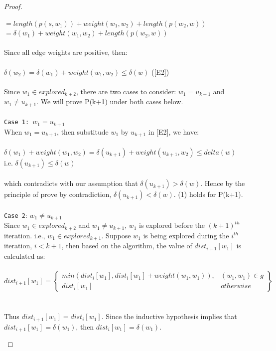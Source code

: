 \begin{proof}
\begin{itemize}
    \tab\tab $= length(p(s, w_1)) + weight(w_1, w_2) + length(p(w_2, w))$ \\
    \tab\tab $= \delta(w_1) + weight(w_1, w_2) + length(p(w_2, w))$
  \\\\
  Since all edge weights are positive, then: 
  \\\\
    \tab $\delta(w_2) = \delta(w_1) + weight(w_1, w_2) \leq \delta(w)$ ([E2])
  \\\\
  Since $w_1 \in explored_{k+2}$, there are two cases to consider: $w_1 =u_{k+1}$ and $w_1 \neq u_{k+1}$. We will prove P(k+1) under both cases below. 
  \\\\
  \texttt{Case 1: $w_1 = u_{k+1}$}
  \\
  When $w_1 = u_{k+1}$, then substitude $w_1$ by $u_{k+1}$ in [E2], we have: 
  \\\\
    \tab $\delta(w_1) + weight(w_1, w_2) = \delta(u_{k+1}) + weight(u_{k+1}, w_2) \leq delta(w)$\\
    \tab i.e.  $\delta(u_{k+1}) \leq \delta(w)$ 
  \\\\
  which contradicts with our assumption that $\delta(u_{k+1}) > \delta(w)$. Hence by the principle of prove by contradiction, $\delta(u_{k+1}) < \delta(w)$. (1) holds for P(k+1). 
  \\\\
  \texttt{Case 2}: $w_1 \neq u_{k+1}$
  \\ 
  Since $w_1 \in explored_{k+2}$ and $w_1 \neq u_{k+1}$, $w_1$ is explored before the $(k+1)^{th}$ iteration. i.e., $w_1 \in explored_{k+1}$. Suppose $w_1$ is being explored during the $i^{th}$ iteration, $i < k+1$, then based on the algorithm, the value of $dist_{i+1}[w_1]$ is calculated as: 
  \\\\
  \tab\[
        dist_{i+1}[w_1] = \left.
       \begin{cases} 
          min(dist_{i}[w_1], dist_{i}[w_1] + weight(w_1,w_1)), & (w_1,w_1) \in g \\ 
          dist_{i}[w_1] & otherwise 
        \end{cases}
        \right\}
      \]
  \\\\
  Thus $dist_{i+1}[w_1] = dist_i[w_1]$. Since the inductive hypothesis implies that $dist_{i+1}[w_1] = \delta(w_1)$, then $dist_i[w_1] = \delta(w_1)$. 

\end{itemize}
\end{proof}
